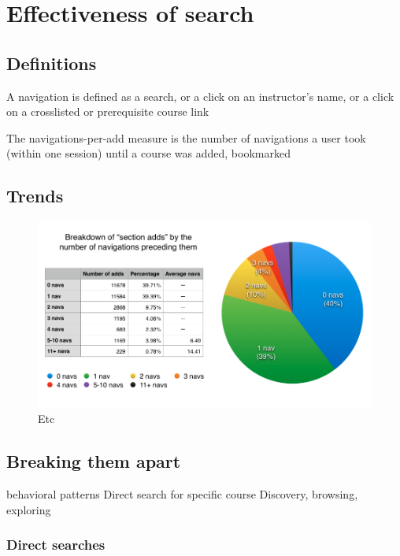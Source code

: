 \section{Effectiveness of search}

\subsection{Definitions}

A navigation is defined as
a search, or
a click on an instructor’s name, or
a click on a crosslisted or prerequisite course link

The navigations-per-add measure is
the number of navigations a user took (within one session) until a course was added, bookmarked

\subsection{Trends}

\begin{figure}
  \centering
  \includegraphics[width=1.0\textwidth]{images/graph/combined_navs}

  \caption{Etc}
  \label{fig:searchtypes}
\end{figure}

\subsection{Breaking them apart}

  behavioral patterns
  Direct search for specific course
  Discovery, browsing, exploring

  \subsubsection{Direct searches}

